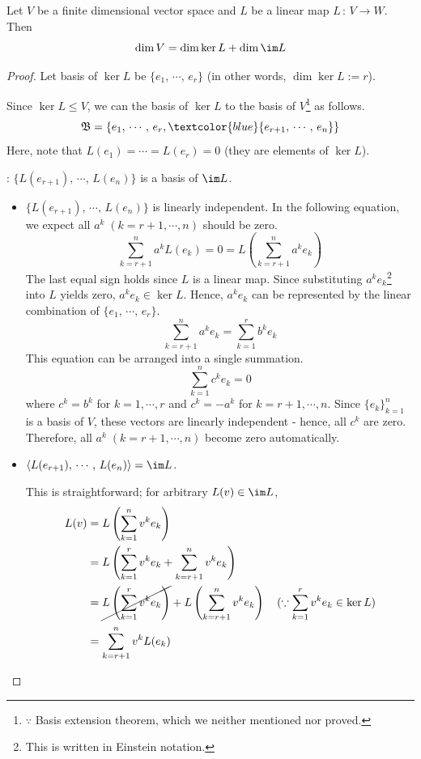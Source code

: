 \documentclass[a4paper, 10pt]{article}
\begin{document}

\begin{theorem}
    Let $V$ be a finite dimensional vector space and $L$ be a linear map $L \,:\, V \rightarrow W$. Then
    \[ \dim V = \dim \ker L + \dim \im L \]
\end{theorem}
\begin{proof}
    Let basis of $\ker L$ be $\{ e_{1} ,\, \cdots ,\, e_{r} \}$ (in other words, $\dim \ker L := r$).

    Since $\ker L \leq V$, we can  the basis of $\ker L$ to the basis of $V$\footnote{$\because$ Basis extension theorem, which we neither mentioned nor proved.} as follows.
    \[ \mathfrak{B} = \{ e_{1} ,\, \cdots ,\, e_{r}, \textcolor{blue}{e_{r+1} ,\, \cdots ,\, e_{n}} \} \]
    Here, note that $L(e_{1}) = \cdots = L(e_{r}) = 0$ (they are elements of $\ker L$).

    : $\{ L(e_{r+1}) ,\, \cdots ,\, L(e_{n}) \}$ is a basis of $\im L$.
    \begin{itemize}
        \item[(1)] $\{ L(e_{r+1}) ,\, \cdots ,\, L(e_{n}) \}$ is linearly independent. In the following equation, we expect all $a^{k} \; (k = r+1, \cdots, n)$ should be zero.
        \[ \sum_{k = r+1}^{n} a^{k} L(e_{k}) = 0 = L \left(\sum_{k = r+1}^{n} a^{k}e_{k}\right) \]
        The last equal sign holds since $L$ is a linear map. Since substituting $a^{k}e_{k}$\footnote{This is written in Einstein notation.} into $L$ yields zero, $a^{k}e_{k} \in \ker L$. Hence, $a^{k}e_{k}$ can be represented by the linear combination of $\{ e_{1} ,\, \cdots ,\, e_{r} \}$.
        \[ \sum_{k=r+1}^{n}a^{k}e_{k} = \sum_{k=1}^{r}b^{k}e_{k} \]
        This equation can be arranged into a single summation.
        \[ \sum_{k=1}^{n}c^{k}e_{k} = 0 \]
        where $c^{k} = b^{k}$ for $k = 1, \cdots, r$ and $c^{k} = -a^{k}$ for $k = r+1, \cdots, n$. Since $\{e_{k}\}_{k=1}^{n}$ is a basis of $V$, these vectors are linearly independent - hence, all $c^{k}$ are zero. Therefore, all $a^{k} \; (k = r+1, \cdots, n)$ become zero automatically.
        \item[(2)] $\left< L(e_{r+1}) ,\, \cdots ,\, L(e_{n}) \right> = \im L$. 
        
        This is straightforward; for arbitrary $L(v) \in \im L$,
        \begin{align*}
            L(v) &= L \left(\sum_{k=1}^{n} v^{k}e_{k}\right) \\
            &= L \left(\sum_{k=1}^{r} v^{k}e_{k} + \sum_{k=r+1}^{n} v^{k}e_{k}\right) \\
            &= \cancel{L \left(\sum_{k=1}^{r} v^{k}e_{k}\right)} + L \left(\sum_{k=r+1}^{n} v^{k}e_{k}\right) \quad (\because \sum_{k=1}^{r} v^{k}e_{k} \in \ker L) \\
            &= \sum_{k=r+1}^{n} v^{k} L(e_{k})
        \end{align*}
    \end{itemize}
\end{proof}
\newpage
\end{document}
